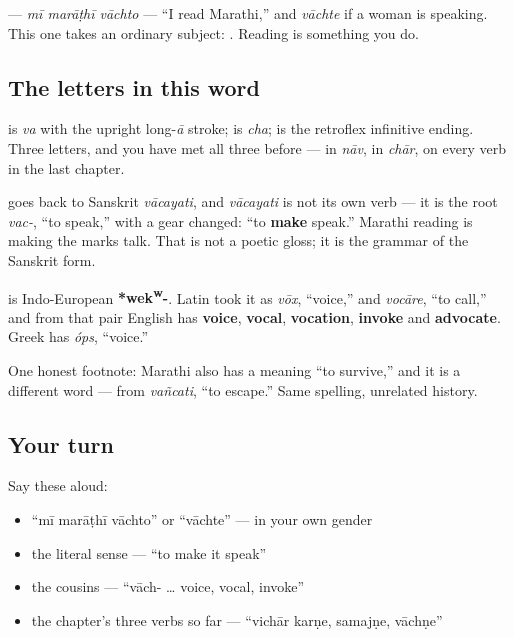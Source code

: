 \textbf{  } — \emph{mī marāṭhī vāchto} — \textquotedblleft{}I read Marathi,\textquotedblright{} and \textbf{} \emph{vāchte} if a woman is speaking. This one takes an ordinary subject: \textbf{}. Reading is something you do.

\subsection*{The letters in this word}
\textbf{} is \textbf{} \emph{va} with the upright long-\emph{ā} stroke; \textbf{} is \emph{cha}; \textbf{} is the retroflex infinitive ending. Three letters, and you have met all three before — \textbf{} in \emph{nāv}, \textbf{} in \emph{chār}, \textbf{} on every verb in the last chapter.

\begin{cousinweb}
\textbf{} goes back to Sanskrit \textbf{} \emph{vācayati}, and \emph{vācayati} is not its own verb — it is the root \textbf{} \emph{vac-}, \textquotedblleft{}to speak,\textquotedblright{} with a gear changed: \textquotedblleft{}to \textbf{make} speak.\textquotedblright{} Marathi reading is making the marks talk. That is not a poetic gloss; it is the grammar of the Sanskrit form.

\textbf{} is Indo-European \textbf{*wek\textsuperscript{w}-}. Latin took it as \emph{vōx}, \textquotedblleft{}voice,\textquotedblright{} and \emph{vocāre}, \textquotedblleft{}to call,\textquotedblright{} and from that pair English has \textbf{voice}, \textbf{vocal}, \textbf{vocation}, \textbf{invoke} and \textbf{advocate}. Greek has \emph{óps}, \textquotedblleft{}voice.\textquotedblright{}

One honest footnote: Marathi also has a \textbf{} meaning \textquotedblleft{}to survive,\textquotedblright{} and it is a different word — from \emph{vañcati}, \textquotedblleft{}to escape.\textquotedblright{} Same spelling, unrelated history.
\end{cousinweb}

\subsection*{Your turn}
Say these aloud:

\begin{itemize}
\raggedright
  \item \textquotedblleft{}mī marāṭhī vāchto\textquotedblright{} or \textquotedblleft{}vāchte\textquotedblright{} — in your own gender
  \item the literal sense — \textquotedblleft{}to make it speak\textquotedblright{}
  \item the cousins — \textquotedblleft{}vāch- … voice, vocal, invoke\textquotedblright{}
  \item the chapter's three verbs so far — \textquotedblleft{}vichār karṇe, samajṇe, vāchṇe\textquotedblright{}
\end{itemize}

